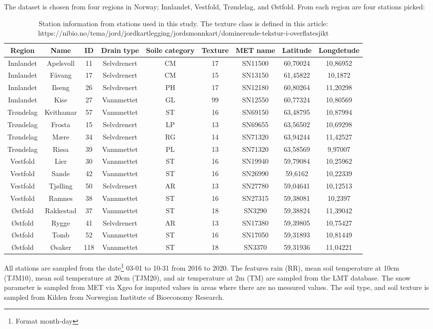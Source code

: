 The dataset is chosen from four regions in Norway; Innlandet, Vestfold, Trøndelag, and Østfold. From each region are four stations picked:
\begin{table}[h]
	\centering
	\begin{tabular}{ccccccccc}
		\hline Region&Name&ID&Drain type&Soile category&Texture&MET name& Latitude&Longdetude\\\hline
		Innlandet&Apelsvoll&11& Selvdrenert&CM& 17&SN11500&60,70024&10,86952\\
		Innlandet& Fåvang&17& Selvdrenert&CM& 15&SN13150&61,45822&10,1872\\
		Innlandet& Ilseng&26& Selvdrenert&PH& 17&SN12180&60,80264&11,20298\\
		Innlandet& Kise&27& Vannmettet&GL& 99&SN12550&60,77324&10,80569\\
		Trøndelag& Kvithamar&57& Vannmettet&ST& 16&SN69150&63,48795&10,87994\\
		Trøndelag& Frosta&15& Selvdrenert&LP& 13&SN69655&63,56502&10,69298\\
		Trøndelag& Mære&34& Selvdrenert&RG& 14&SN71320&63,94244&11,42527\\
		Trøndelag& Rissa&39& Vannmettet&PL& 13&SN71320&63,58569&9,97007\\
		Vestfold& Lier&30& Vannmettet&ST& 16&SN19940&59,79084&10,25962\\
		Vestfold& Sande&42& Vannmettet&ST& 16&SN26990&59,6162&10,22339\\
		Vestfold& Tjølling&50& Selvdrenert&AR& 13&SN27780&59,04641&10,12513\\
		Vestfold& Ramnes&38& Vannmettet&ST& 16&SN27315&59,38081&10,2397\\
		Østfold& Rakkestad&37& Vannmettet&ST& 18&SN3290&59,38824&11,39042\\
		Østfold& Rygge&41& Selvdrenert&AR& 13&SN17380&59,39805&10,75427\\
		Østfold& Tomb&52& Vannmettet&ST& 16&SN17050&59,31893&10,81449\\
		Østfold& Øsaker&118& Vannmettet&ST& 18&SN3370&59,31936&11,04221\\\hline
	\end{tabular}
	\caption{Station information from stations used in this study. The texture class is defined in this article: https://nibio.no/tema/jord/jordkartlegging/jordsmonnkart/dominerende-tekstur-i-overflatesjikt}
\end{table}

All stations are sampled from the date\footnote{Format month-day} 03-01 to 10-31 from 2016 to 2020. The features rain (RR), mean soil temperature at 10cm (TJM10), mean soil temperature at 20cm (TJM20), and air temperature at 2m (TM) are sampled from the LMT database. The snow parameter is sampled from MET via Xgeo for imputed values in areas where there are no messured values. The soil type, and soil texture is sampled from Kilden from Norwegian Institute of Bioeconomy Research.

